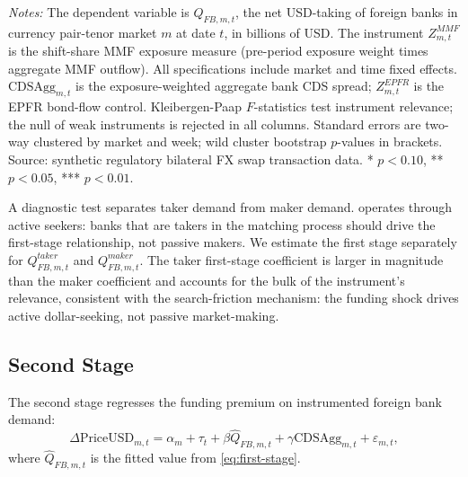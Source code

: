 \begin{table}[htbp]
\centering
\begin{threeparttable}
\caption{First Stage: MMF Instrument and Foreign Bank Dollar Demand}
\label{tab:iv-first-stage}

\begin{tablenotes}\small
\item \textit{Notes:} The dependent variable is $Q_{FB,m,t}$, the net USD-taking
of foreign banks in currency pair-tenor market $m$ at date $t$, in billions of
USD. The instrument $Z_{m,t}^{MMF}$ is the shift-share MMF exposure measure
(pre-period exposure weight times aggregate MMF outflow). All specifications
include market and time fixed effects. $\text{CDSAgg}_{m,t}$ is the
exposure-weighted aggregate bank CDS spread; $Z_{m,t}^{EPFR}$ is the EPFR
bond-flow control. Kleibergen-Paap $F$-statistics test instrument relevance;
the null of weak instruments is rejected in all columns. Standard errors are
two-way clustered by market and week; wild cluster bootstrap $p$-values in
brackets. Source: synthetic regulatory bilateral FX swap transaction data.
* $p < 0.10$, ** $p < 0.05$, *** $p < 0.01$.
\end{tablenotes}
\end{threeparttable}
\end{table}

A diagnostic test separates taker demand from maker demand. 
operates through active seekers: banks that are takers in the matching process
should drive the first-stage relationship, not passive makers. We estimate the
first stage separately for $Q_{FB,m,t}^{taker}$ and $Q_{FB,m,t}^{maker}$.
The taker first-stage coefficient is larger in magnitude than the maker coefficient
and accounts for the bulk of the instrument's relevance, consistent with the
search-friction mechanism: the funding shock drives active dollar-seeking, not
passive market-making.

\subsection{Second Stage}
\label{subsec:second-stage}

The second stage regresses the funding premium on instrumented foreign bank demand:
\begin{equation}
  \Delta\text{PriceUSD}_{m,t} = \alpha_m + \tau_t + \beta \hat{Q}_{FB,m,t} +
  \gamma \text{CDSAgg}_{m,t} + \varepsilon_{m,t},
  \label{eq:second-stage}
\end{equation}
where $\hat{Q}_{FB,m,t}$ is the fitted value from \cref{eq:first-stage}.

